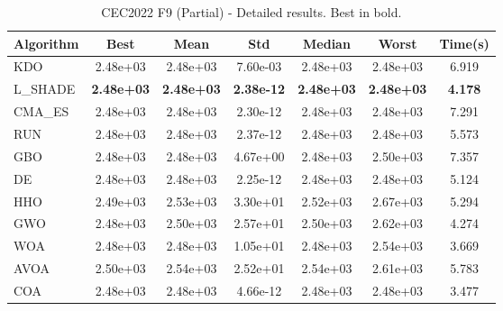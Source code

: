 \begin{table}[H]
\centering\small
\caption{CEC2022 F9 (Partial) - Detailed results. Best in bold.}
\label{tab:cec2022_F9}
\begin{tabular}{lcccccc}
\toprule
\textbf{Algorithm} & \textbf{Best} & \textbf{Mean} & \textbf{Std} & \textbf{Median} & \textbf{Worst} & \textbf{Time(s)} \\
\midrule
KDO & 2.48e+03 & 2.48e+03 & 7.60e-03 & 2.48e+03 & 2.48e+03 & 6.919 \\
L_SHADE & \textbf{2.48e+03} & \textbf{2.48e+03} & \textbf{2.38e-12} & \textbf{2.48e+03} & \textbf{2.48e+03} & \textbf{4.178} \\
CMA_ES & 2.48e+03 & 2.48e+03 & 2.30e-12 & 2.48e+03 & 2.48e+03 & 7.291 \\
RUN & 2.48e+03 & 2.48e+03 & 2.37e-12 & 2.48e+03 & 2.48e+03 & 5.573 \\
GBO & 2.48e+03 & 2.48e+03 & 4.67e+00 & 2.48e+03 & 2.50e+03 & 7.357 \\
DE & 2.48e+03 & 2.48e+03 & 2.25e-12 & 2.48e+03 & 2.48e+03 & 5.124 \\
HHO & 2.49e+03 & 2.53e+03 & 3.30e+01 & 2.52e+03 & 2.67e+03 & 5.294 \\
GWO & 2.48e+03 & 2.50e+03 & 2.57e+01 & 2.50e+03 & 2.62e+03 & 4.274 \\
WOA & 2.48e+03 & 2.48e+03 & 1.05e+01 & 2.48e+03 & 2.54e+03 & 3.669 \\
AVOA & 2.50e+03 & 2.54e+03 & 2.52e+01 & 2.54e+03 & 2.61e+03 & 5.783 \\
COA & 2.48e+03 & 2.48e+03 & 4.66e-12 & 2.48e+03 & 2.48e+03 & 3.477 \\
\bottomrule
\end{tabular}
\end{table}
